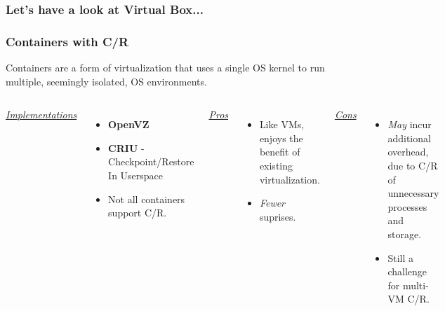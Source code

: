 \documentclass[compress]{beamer}
\begin{document}

\begin{frame}
\frametitle{Let's have a look at Virtual Box...}

{}
{}

\end{frame}


\begin{frame}
\frametitle{Containers with C/R}
Containers are a form of virtualization that uses a single OS
kernel to run multiple, seemingly isolated, OS environments.
\begin{columns}[t]
\ul{\textit{Implementations}}
\begin{itemize}
\item \textbf{OpenVZ}
\item \textbf{CRIU} - Checkpoint/Restore In Userspace
\item Not all containers support C/R.
\end{itemize}

\ul{\textit{Pros}}
\begin{itemize}
\item Like VMs, enjoys the benefit of existing virtualization.
\item \textit{Fewer} suprises.
\end{itemize}

\ul{\textit{Cons}}
\begin{itemize}
\item \textit{May} incur additional overhead, due to C/R of
unnecessary processes and storage.
\item Still a challenge for multi-VM C/R.
\end{itemize}

\end{columns}

\end{frame}
  
\end{document}
